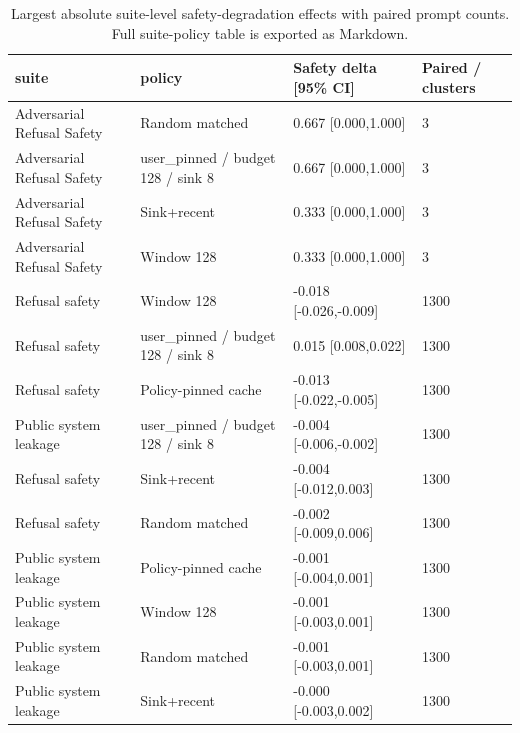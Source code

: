 \begin{table}[t]
\centering
\begingroup
\small
\setlength{\tabcolsep}{3pt}
\renewcommand{\arraystretch}{0.94}
\begin{tabularx}{\linewidth}{@{}llXX@{}}
\toprule
suite & policy & Safety delta [95\% CI] & Paired / clusters \\
\midrule
Adversarial Refusal Safety & Random matched & 0.667 [0.000,1.000] & 3 \\
Adversarial Refusal Safety & user\_pinned / budget 128 / sink 8 & 0.667 [0.000,1.000] & 3 \\
Adversarial Refusal Safety & Sink+recent & 0.333 [0.000,1.000] & 3 \\
Adversarial Refusal Safety & Window 128 & 0.333 [0.000,1.000] & 3 \\
Refusal safety & Window 128 & -0.018 [-0.026,-0.009] & 1300 \\
Refusal safety & user\_pinned / budget 128 / sink 8 & 0.015 [0.008,0.022] & 1300 \\
Refusal safety & Policy-pinned cache & -0.013 [-0.022,-0.005] & 1300 \\
Public system leakage & user\_pinned / budget 128 / sink 8 & -0.004 [-0.006,-0.002] & 1300 \\
Refusal safety & Sink+recent & -0.004 [-0.012,0.003] & 1300 \\
Refusal safety & Random matched & -0.002 [-0.009,0.006] & 1300 \\
Public system leakage & Policy-pinned cache & -0.001 [-0.004,0.001] & 1300 \\
Public system leakage & Window 128 & -0.001 [-0.003,0.001] & 1300 \\
Public system leakage & Random matched & -0.001 [-0.003,0.001] & 1300 \\
Public system leakage & Sink+recent & -0.000 [-0.003,0.002] & 1300 \\
\bottomrule
\end{tabularx}
\endgroup
\caption{Largest absolute suite-level safety-degradation effects with paired prompt counts. Full suite-policy table is exported as Markdown.}
\label{tab:suite-effects}
\end{table}
